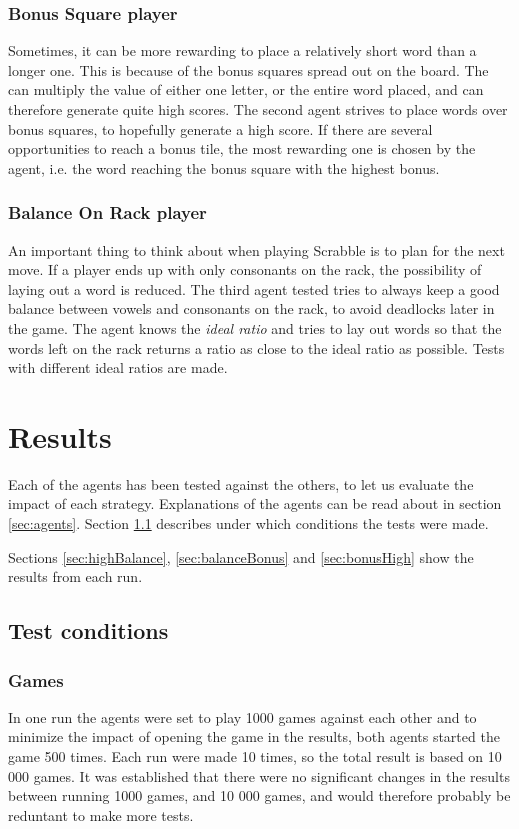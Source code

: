 \documentclass[a4paper, 12pt]{report}
\begin{document}
\subsection{Bonus Square player}
Sometimes, it can be more rewarding to place a relatively short word than a longer one. This is because of the bonus squares spread out on the board. The can multiply the value of either one letter, or the entire word placed, and can therefore generate quite high scores. The second agent strives to place words over bonus squares, to hopefully generate a high score. If there are several opportunities to reach a bonus tile, the most rewarding one is chosen by the agent, i.e. the word reaching the bonus square with the highest bonus.

\subsection{Balance On Rack player}
An important thing to think about when playing Scrabble is to plan for the next move. If a player ends up with only consonants on the rack, the possibility of laying out a word is reduced. The third agent tested tries to always keep a good balance between vowels and consonants on the rack, to avoid deadlocks later in the game. The agent knows the \emph{ideal ratio} and tries to lay out words so that the words left on the rack returns a ratio as close to the ideal ratio as possible. Tests with different ideal ratios are made.

\chapter{Results}
\label{sec:analysis}
Each of the agents has been tested against the others, to let us evaluate the impact of each strategy. Explanations of the agents can be read about in section \ref{sec:agents}. Section \ref{sec:conditions} describes under which conditions the tests were made.

Sections \ref{sec:highBalance}, \ref{sec:balanceBonus} and \ref{sec:bonusHigh} show the results from each run.
 
\section{Test conditions}
\label{sec:conditions}
\subsection{Games}
In one run the agents were set to play 1000 games against each other and to minimize the impact of opening the game in the results, both agents started the game 500 times. Each run were made 10 times, so the total result is based on 10 000 games. It was established that there were no significant changes in the results between running 1000 games, and 10 000 games, and would therefore probably be reduntant to make more tests. 
\end{document}

